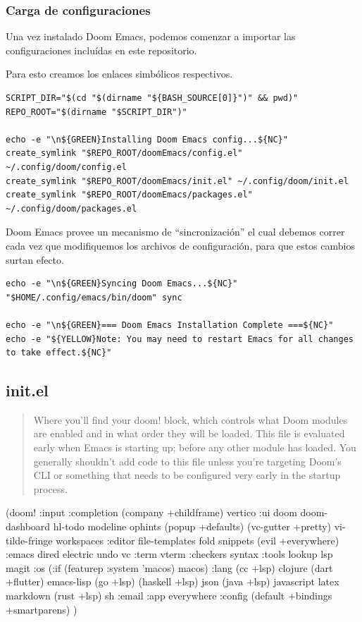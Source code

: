 \documentclass[11pt]{article}
\begin{document}
\subsubsection{Carga de configuraciones}
\label{sec:org379ba49}

Una vez instalado Doom Emacs, podemos comenzar a importar las configuraciones incluídas en este repositorio.

Para esto creamos los enlaces simbólicos respectivos.

\begin{verbatim}
SCRIPT_DIR="$(cd "$(dirname "${BASH_SOURCE[0]}")" && pwd)"
REPO_ROOT="$(dirname "$SCRIPT_DIR")"

echo -e "\n${GREEN}Installing Doom Emacs config...${NC}"
create_symlink "$REPO_ROOT/doomEmacs/config.el" ~/.config/doom/config.el
create_symlink "$REPO_ROOT/doomEmacs/init.el" ~/.config/doom/init.el
create_symlink "$REPO_ROOT/doomEmacs/packages.el" ~/.config/doom/packages.el

\end{verbatim}

Doom Emacs provee un mecanismo de ``sincronización'' el cual debemos correr cada vez que modifiquemos los archivos de configuración, para que estos cambios surtan efecto.

\begin{verbatim}
echo -e "\n${GREEN}Syncing Doom Emacs...${NC}"
"$HOME/.config/emacs/bin/doom" sync

echo -e "\n${GREEN}=== Doom Emacs Installation Complete ===${NC}"
echo -e "${YELLOW}Note: You may need to restart Emacs for all changes to take effect.${NC}"

\end{verbatim}
\subsection{init.el}
\label{sec:org1fcb531}

\begin{quote}
Where you’ll find your doom! block, which controls what Doom modules are enabled and in what order they will be loaded.
This file is evaluated early when Emacs is starting up; before any other module has loaded. You generally shouldn’t add code to this file unless you’re targeting Doom’s CLI or something that needs to be configured very early in the startup process.
\end{quote}

(doom!
    :input
    :completion
    (company +childframe)
    vertico
    :ui
    doom
    doom-dashboard
    hl-todo
    modeline
    ophints
    (popup +defaults)
    (vc-gutter +pretty)
    vi-tilde-fringe
    workspaces
    :editor
    file-templates
    fold
    snippets
    (evil +everywhere)
    :emacs
    dired
    electric
    undo
    vc
    :term
    vterm
    :checkers
    syntax
    :tools
    lookup
    lsp
    magit
    :os
    (:if (featurep :system 'macos) macos)
    :lang
    (cc +lsp)
    clojure
    (dart +flutter)
    emacs-lisp
    (go +lsp)
    (haskell +lsp)
    json
    (java +lsp)
    javascript
    latex
    markdown
    (rust +lsp)
    sh
    :email
    :app
    everywhere
    :config
    (default +bindings +smartparens)
)
\end{document}
